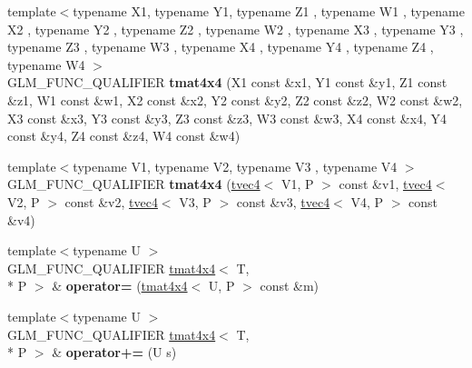 \begin{DoxyCompactItemize}
\item 
\hypertarget{structglm_1_1detail_1_1tmat4x4_a4ff165b66bf5ce7b3a56f17727741389}{{\footnotesize template$<$typename X1, typename Y1, typename Z1 , typename W1 , typename X2 , typename Y2 , typename Z2 , typename W2 , typename X3 , typename Y3 , typename Z3 , typename W3 , typename X4 , typename Y4 , typename Z4 , typename W4 $>$ }\\G\-L\-M\-\_\-\-F\-U\-N\-C\-\_\-\-Q\-U\-A\-L\-I\-F\-I\-E\-R {\bfseries tmat4x4} (X1 const \&x1, Y1 const \&y1, Z1 const \&z1, W1 const \&w1, X2 const \&x2, Y2 const \&y2, Z2 const \&z2, W2 const \&w2, X3 const \&x3, Y3 const \&y3, Z3 const \&z3, W3 const \&w3, X4 const \&x4, Y4 const \&y4, Z4 const \&z4, W4 const \&w4)}\label{structglm_1_1detail_1_1tmat4x4_a4ff165b66bf5ce7b3a56f17727741389}

\item 
\hypertarget{structglm_1_1detail_1_1tmat4x4_ad7a7e2dc47a7bd42e43ddf68efbab34f}{{\footnotesize template$<$typename V1, typename V2, typename V3 , typename V4 $>$ }\\G\-L\-M\-\_\-\-F\-U\-N\-C\-\_\-\-Q\-U\-A\-L\-I\-F\-I\-E\-R {\bfseries tmat4x4} (\hyperlink{structglm_1_1detail_1_1tvec4}{tvec4}$<$ V1, P $>$ const \&v1, \hyperlink{structglm_1_1detail_1_1tvec4}{tvec4}$<$ V2, P $>$ const \&v2, \hyperlink{structglm_1_1detail_1_1tvec4}{tvec4}$<$ V3, P $>$ const \&v3, \hyperlink{structglm_1_1detail_1_1tvec4}{tvec4}$<$ V4, P $>$ const \&v4)}\label{structglm_1_1detail_1_1tmat4x4_ad7a7e2dc47a7bd42e43ddf68efbab34f}

\item 
\hypertarget{structglm_1_1detail_1_1tmat4x4_a7afed31f7061ff2a5146b9f0c50a8542}{{\footnotesize template$<$typename U $>$ }\\G\-L\-M\-\_\-\-F\-U\-N\-C\-\_\-\-Q\-U\-A\-L\-I\-F\-I\-E\-R \hyperlink{structglm_1_1detail_1_1tmat4x4}{tmat4x4}$<$ T, \\*
P $>$ \& {\bfseries operator=} (\hyperlink{structglm_1_1detail_1_1tmat4x4}{tmat4x4}$<$ U, P $>$ const \&m)}\label{structglm_1_1detail_1_1tmat4x4_a7afed31f7061ff2a5146b9f0c50a8542}

\item 
\hypertarget{structglm_1_1detail_1_1tmat4x4_a6da15355273fb3d106d71e9f97fa5654}{{\footnotesize template$<$typename U $>$ }\\G\-L\-M\-\_\-\-F\-U\-N\-C\-\_\-\-Q\-U\-A\-L\-I\-F\-I\-E\-R \hyperlink{structglm_1_1detail_1_1tmat4x4}{tmat4x4}$<$ T, \\*
P $>$ \& {\bfseries operator+=} (U s)}\label{structglm_1_1detail_1_1tmat4x4_a6da15355273fb3d106d71e9f97fa5654}


\end{DoxyCompactItemize}
